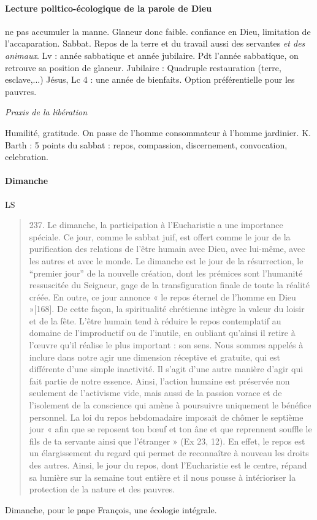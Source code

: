 \paragraph{Lecture politico-écologique de la parole de Dieu} ne pas accumuler la manne. Glaneur donc faible. confiance en Dieu, limitation de l'accaparation.
Sabbat. Repos de la terre et du travail aussi des servantes \textit{et des animaux}. 
Lv : année sabbatique et année jubilaire. Pdt l'année sabbatique, on retrouve sa position de glaneur. Jubilaire : Quadruple restauration (terre, esclave,...)
Jésus, Lc 4 : une année de bienfaits. Option préférentielle pour les pauvres.

\textit{Praxis de la libération}

Humilité, gratitude. On passe de l'homme consommateur à l'homme jardinier.
K. Barth : 
5 points du sabbat : 
repos, compassion, discernement, convocation, celebration.

\paragraph{Dimanche} LS

\begin{quote}
    237. Le dimanche, la participation à l’Eucharistie a une importance spéciale. Ce jour, comme le sabbat juif, est offert comme le jour de la purification des relations de l’être humain avec Dieu, avec lui-même, avec les autres et avec le monde. Le dimanche est le jour de la résurrection, le “premier jour” de la nouvelle création, dont les prémices sont l’humanité ressuscitée du Seigneur, gage de la transfiguration finale de toute la réalité créée. En outre, ce jour annonce « le repos éternel de l’homme en Dieu »[168]. De cette façon, la spiritualité chrétienne intègre la valeur du loisir et de la fête. L’être humain tend à réduire le repos contemplatif au domaine de l’improductif ou de l’inutile, en oubliant qu’ainsi il retire à l’œuvre qu’il réalise le plus important : son sens. Nous sommes appelés à inclure dans notre agir une dimension réceptive et gratuite, qui est différente d’une simple inactivité. Il s’agit d’une autre manière d’agir qui fait partie de notre essence. Ainsi, l’action humaine est préservée non seulement de l’activisme vide, mais aussi de la passion vorace et de l’isolement de la conscience qui amène à poursuivre uniquement le bénéfice personnel. La loi du repos hebdomadaire imposait de chômer le septième jour « afin que se reposent ton bœuf et ton âne et que reprennent souffle le fils de ta servante ainsi que l’étranger » (Ex 23, 12). En effet, le repos est un élargissement du regard qui permet de reconnaître à nouveau les droits des autres. Ainsi, le jour du repos, dont l’Eucharistie est le centre, répand sa lumière sur la semaine tout entière et il nous pousse à intérioriser la protection de la nature et des pauvres.
\end{quote}
Dimanche, pour le pape François, une écologie intégrale. 

